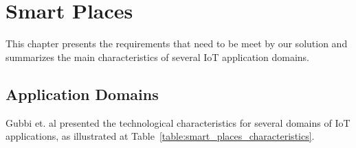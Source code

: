 
\chapter{Smart Places}
\label{appendix:smart_place}
This chapter presents the requirements that need to be meet by our solution and summarizes the main
characteristics of several \gls{IoT} application domains.

\section{Application Domains}
\label{sec:application_domains}

Gubbi et. al \cite{gubbi2013internet} presented the technological characteristics for several domains
of \gls{IoT} applications, as illustrated at Table~\ref{table:smart_places_characteristics}.

